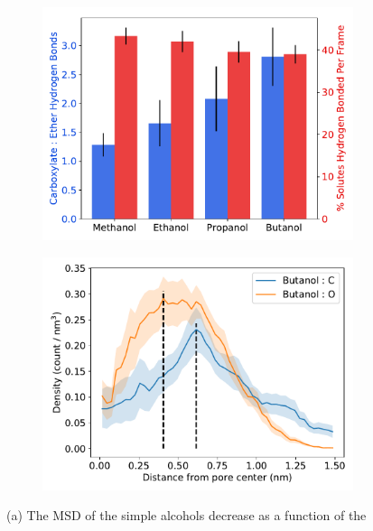 \documentclass[journal=jpcbfk,manuscript=article]{achemso}
\begin{document}
\begin{figure}[!htb]
\begin{subfigure}{0.45\textwidth}
  \includegraphics[width=\linewidth]{simple_alcohol_hbonds.pdf}
  \caption{}\label{fig:simple_alcohol_hbonds}
  \end{subfigure}
  \begin{subfigure}{0.45\textwidth}
  \includegraphics[width=\linewidth]{butanol_CO.pdf}
  \caption{}\label{fig:butanol_CO}
  \end{subfigure}
  \caption{(a) The MSD of the simple alcohols decrease as a function of the
}
\end{figure}
\end{document}

